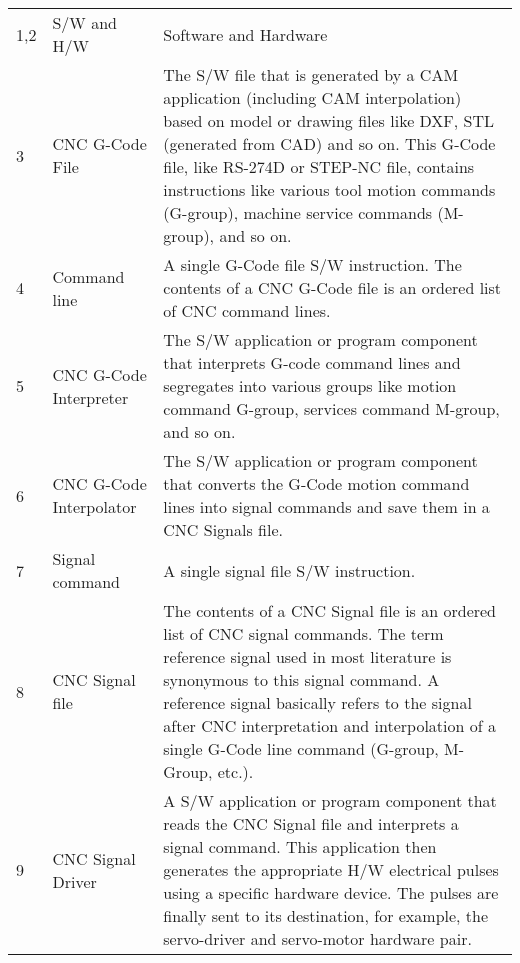 
\begin{table}[ht]
	\begin{center}
		\begin{tabular}{ |p{0.5cm}|p{3.4cm}|p{11.0cm}| }
			\rowcolor{LIGHTCYAN}			
			\hline \multicolumn{3}{|c|}{\textbf{CNC Terminology Part 1 of 2}} \\ [1.0ex]
			
			\hline 1,2  & S/W	and H/W	      & Software and Hardware\\ 
	
			\hline 3 & CNC G-Code File & The S/W file that is generated by a CAM application (including CAM interpolation) based on model or drawing files like DXF, STL (generated from CAD) and so on. This G-Code file, like RS-274D or STEP-NC file, contains instructions like various tool motion commands (G-group), machine service commands (M-group), and so on.\\ 
			
			\hline 4 & Command line  & A single G-Code file S/W instruction. The contents of a CNC G-Code file is an ordered list of CNC command lines.\\ 
			
			\hline 5 & CNC G-Code Interpreter & The S/W application or program component that interprets G-code command lines and segregates into various groups like motion command G-group, services command M-group, and so on.\\ 
			
			\hline 6 & CNC G-Code Interpolator  & The S/W application or program component that converts the G-Code motion command lines into signal commands and save them in a CNC Signals file.\\ 
			
			\hline 7 & Signal command & A single signal file S/W instruction. \\
			\hline 8 & CNC Signal file & The contents of a CNC Signal file is an ordered list of CNC signal commands. The term reference signal used in most literature is synonymous to this signal command. A reference signal basically refers to the signal after CNC interpretation and interpolation of a single G-Code line command (G-group, M-Group, etc.). \\  
			
			\hline 9 & CNC Signal Driver & A S/W application or program component that reads the CNC Signal file and interprets a signal command. This application then generates the appropriate H/W electrical pulses using a specific hardware device. The pulses are finally sent to its destination, for example, the servo-driver and servo-motor hardware pair. \\ 
			

\end{tabular}
\end{center}
\end{table}

